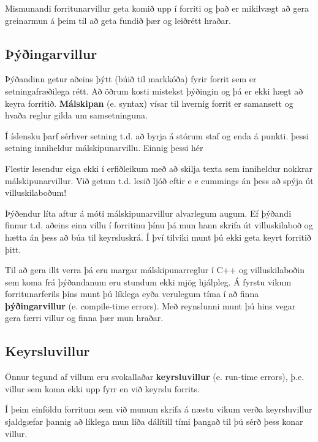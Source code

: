 Mismunandi forritunarvillur geta komið upp í forriti og það er mikilvægt að gera greinarmun á þeim til að geta fundið þær og leiðrétt hraðar.

\subsection{Þýðingarvillur}

Þýðandinn getur aðeins þýtt (búið til markkóða) fyrir forrit sem er setningafræðilega rétt.
Að öðrum kosti mistekst þýðingin og þá er ekki hægt að keyra forritið.
{\bf Málskipan} (e. syntax) vísar til hvernig forrit er samansett og hvaða reglur gilda um samsetninguna.


Í íslensku þarf sérhver setning t.d. að byrja á stórum staf og enda á punkti.
þessi setning inniheldur málskipunarvillu. Einnig þessi hér 

Flestir lesendur eiga ekki í erfiðleikum með að skilja texta sem inniheldur nokkrar málskipunarvillur.
Við getum t.d. lesið ljóð eftir e e cummings án þess að spýja út villuskilaboðum!

Þýðendur líta aftur á móti málskipunarvillur alvarlegum augum.
Ef þýðandi finnur t.d. aðeins eina villu í forritinu þínu þá mun hann skrifa út villuskilaboð og hætta án þess að búa til keyrsluskrá.
Í því tilviki munt þú ekki geta keyrt forritið þitt.

Til að gera illt verra þá eru margar málskipunarreglur í C++ og villuskilaboðin sem koma frá þýðandanum eru stundum ekki mjög hjálpleg.
Á fyrstu vikum forritunarferils þíns munt þú líklega eyða verulegum tíma í að finna {\bf þýðingarvillur} (e. compile-time errors).
Með reynslunni munt þú hins vegar gera færri villur og finna þær mun hraðar.

\subsection{Keyrsluvillur}
\label{run-time}

Önnur tegund af villum eru svokallaðar {\bf keyrsluvillur} (e. run-time errors), þ.e. villur sem koma ekki upp fyrr en við keyrslu forrits.

Í þeim einföldu forritum sem við munum skrifa á næstu vikum verða keyrsluvillur sjaldgæfar þannig að líklega mun líða dálítill tími þangað til þú sérð þess konar villur.


